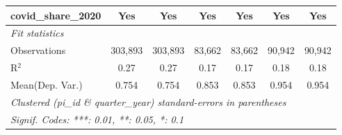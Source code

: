 \begin{tabular}{lcccccc}
   covid\_share\_2020                                          & Yes           & Yes           & Yes           & Yes           & Yes           & Yes\\  
   \midrule
   \emph{Fit statistics}\\
   Observations                                                & 303,893       & 303,893       & 83,662        & 83,662        & 90,942        & 90,942\\  
   R$^2$                                                       & 0.27          & 0.27          & 0.17          & 0.17          & 0.18          & 0.18\\  
Mean(Dep. Var.) & 0.754 & 0.754 & 0.853 & 0.853 & 0.954 & 0.954 \\
   \midrule \midrule
   \multicolumn{7}{l}{\emph{Clustered (pi\_id \& quarter\_year) standard-errors in parentheses}}\\
   \multicolumn{7}{l}{\emph{Signif. Codes: ***: 0.01, **: 0.05, *: 0.1}}\\
\end{tabular}
\par\endgroup
